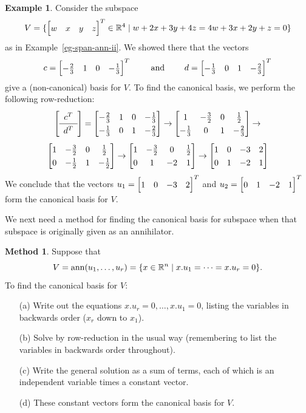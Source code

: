 \documentclass[reqno]{amsart}
\theoremstyle{definition}
\newtheorem{example}[theorem]{Example}
\newtheorem{method}[theorem]{Method}
\begin{document}
\begin{example}\label{eg-span-ann-ii-canonical}
 Consider the subspace
 \[ V = \{\bbm w&x&y&z\ebm^T\in\R^4\st w+2x+3y+4z=4w+3x+2y+z=0\}  \]
 as in Example~\ref{eg-span-ann-ii}.  We showed there that the vectors
 \[ c = \bbm -\tfrac{2}{3} & 1 & 0 & -\tfrac{1}{3} \ebm^T
    \hspace{2em} \text{ and } \hspace{2em}
    d = \bbm -\tfrac{1}{3} & 0 & 1 & -\tfrac{2}{3} \ebm^T
 \]
 give a (non-canonical) basis for $V$.  To find the canonical basis,
 we perform the following row-reduction:
 \[ {\renewcommand{\arraystretch}{1.3}
     \left[\begin{array}{c} c^T \\ \hline d^T \end{array}\right]}
    =
    \bbm -\tfrac{2}{3} & 1 & 0 & -\tfrac{1}{3} \\
         -\tfrac{1}{3} & 0 & 1 & -\tfrac{2}{3} \ebm
    \to
    \bbm 1 & -\tfrac{3}{2} & 0 & \tfrac{1}{2} \\
         -\tfrac{1}{3} & 0 & 1 & -\tfrac{2}{3} \ebm
    \to
 \] \[
    \bbm 1 & -\tfrac{3}{2} & 0 & \tfrac{1}{2} \\
         0 & -\tfrac{1}{2} & 1 & -\tfrac{1}{2} \ebm
    \to
    \bbm 1 & -\tfrac{3}{2} & 0  & \tfrac{1}{2} \\
         0 & 1             & -2 & 1 \ebm
    \to
    \bbm 1 & 0 & -3 & 2 \\
         0 & 1 & -2 & 1 \ebm
 \]
 We conclude that the vectors $u_1=\bbm 1 & 0 & -3 & 2\ebm^T$ and
 $u_2=\bbm 0&1&-2&1\ebm^T$ form the canonical basis for $V$.
\end{example}

We next need a method for finding the canonical basis for subspace
when that subspace is originally given as an annihilator.

\begin{method}\label{meth-ann-basis}
 Suppose that
 \[ V=\operatorname{ann}(u_1,\dotsc,u_r)=\{x\in{\mathbb{R}}^n\;|\; x.u_1=\dotsb=x.u_r=0\}. \]
 To find the canonical basis for $V$:
 \begin{itemize}
  \item[(a)] Write out the equations $x.u_r=0,\dotsc,x.u_1=0$, listing
   the variables in backwards order ($x_r$ down to $x_1$).
  \item[(b)] Solve by row-reduction in the usual way (remembering to
   list the variables in backwards order throughout).
  \item[(c)] Write the general solution as a sum of terms, each of
   which is an independent variable times a constant vector.
  \item[(d)] These constant vectors form the canonical basis for $V$.
 \end{itemize}
\end{method}
\end{document}
